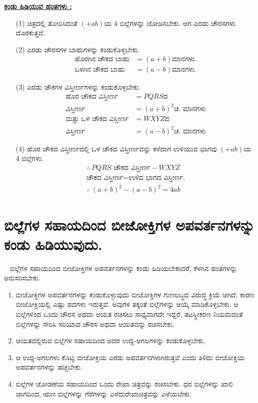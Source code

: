 \begin{enumerate}
\noindent
{\textbf{\underline{ಕಂಡು ಹಿಡಿಯುವ ಹಂತಗಳು :}}}
\begin{itemize}
\item[(1)] ಚಿತ್ರದಲ್ಲಿ ತೋರಿಸಿದಂತೆ $(+ab)$ಯ 4 ಬಿಲ್ಲೆಗಳನ್ನು ಜೋಡಿಸಬೇಕು. ಆಗ ಎರಡು ಚೌರಸಗಳು ದೊರಕುತ್ತವೆ. 
\item[(2)] ಎರಡು ಚೌರಸಗಳ ಬಾಹುಗಳನ್ನು ಕಂಡುಕೊಳ್ಳಬೇಕು.
\begin{align*}
\text{ಹೊರಗಿನ ಚೌಕದ ಬಾಹು} & = (a+b) \text{ಮಾನಗಳು.}\\
\text{ಒಳಗಿನ ಚೌಕದ ಬಾಹು} & = (a-b) \text{ಮಾನಗಳು.}
\end{align*}

\item[(3)] ಎರಡು ಚೌಕಗಳ ವಿಸ್ತೀರ್ಣಗಳನ್ನು ಕಂಡುಕೊಳ್ಳಬೇಕು. 
\begin{align*}
\text{ಹೊರ ಚೌಕದ ವಿಸ್ತೀರ್ಣ} & = PQRS\text{ದ}\\
 \text{ವಿಸ್ತೀರ್ಣ} & = (a+b)^2 \text{ಚ. ಮಾನಗಳು}\\
\text{ಮತ್ತು ಒಳ ಚೌಕದ ವಿಸ್ತೀರ್ಣ} & = WXYZ\text{ದ}\\
\text{ವಿಸ್ತೀರ್ಣ} & = (a-b)^2 \text{ಚ. ಮಾನಗಳು}
\end{align*}

\item[(4)] ಹೊರ ಚೌಕದ ವಿಸ್ತೀರ್ಣದಲ್ಲಿ ಒಳ ಚೌಕದ ವಿಸ್ತೀರ್ಣವನ್ನು ಕಳೆದಾಗ ಉಳಿಯುವ ಭಾಗವು $(+ab)$ಯ 4 ಬಿಲ್ಲೆಗಳು.
\begin{gather*}
\therefore~ PQRS \text{ ಚೌಕದ ವಿಸ್ತೀರ್ಣ} - WXYZ\\
 \text{ಚೌಕದ ವಿಸ್ತೀರ್ಣ}  = \text{ಉಳಿದ ಭಾಗದ ವಿಸ್ತೀರ್ಣ.}\\
\therefore~ (a+b)^2 - (a-b)^2 = 4ab
\end{gather*} 
\end{itemize}
\end{enumerate}

\section{ಬಿಲ್ಲೆಗಳ ಸಹಾಯದಿಂದ ಬೀಜೋಕ್ತಿಗಳ ಅಪವರ್ತನಗಳನ್ನು ಕಂಡು ಹಿಡಿಯುವುದು.}\label{sec3.8}%
~
\vspace{-0.1cm}
ಬಿಲ್ಲೆಗಳ ಸಹಾಯದಿಂದ ಬೀಜೋಕ್ತಿಗಳ ಅಪವರ್ತನಗಳನ್ನು ಕಂಡು ಹಿಡಿಯಬೇಕಾದರೆ, ಕೆಳಗಿನ ಹಂತಗಳನ್ನು ಅನುಸರಿಸಬೇಕು. 
\begin{enumerate}
\item ಬೀಜೋಕ್ತಿಗಳ ಅಪವರ್ತನಗಳನ್ನು ಕಂಡುಕೊಳ್ಳುವುದು ಬೀಜೋಕ್ತಿಗಳ ಗುಣಲಬ್ಧದ ವಿರುದ್ಧ ಕ್ರಿಯೆ ಆಗಿದೆ. ಕಾರಣ ಬೀಜೋಕ್ತಿಯಲ್ಲಿ ಎಷ್ಟು ಪದಗಳು ಇರುತ್ತವೆ. ಅವುಗಳ ತಕ್ಕಂತೆ ಬಿಲ್ಲೆಗಳನ್ನು ಆಯ್ಕೆ ಮಾಡಿಕೊಳ್ಳಬೇಕು. ಆ ಬಿಲ್ಲೆಗಳಿಂದ ಒಂದು ಚೌರಸ ಅಥವಾ ಆಯತ ರಚಿಸಲು ಸಾಧ್ಯವಾಗದೇ ಇದ್ದರೆ, ತಟಸ್ಥೀಕರಣ ನಿಯಮದಂತೆ ಬಿಲ್ಲೆಗಳನ್ನು ಸೇರಿಸಿ ಸರಿಯಾದ ಚೌರಸ ಅಥವಾ ಆಯತವನ್ನು ರಚಿಸಬೇಕು. 
\item ಆಯತದಲ್ಲಿರುವ ಬಿಲ್ಲೆಗಳ ಸಹಾಯದಿಂದ ಅದರ ಉದ್ದ-ಅಗಲಗಳನ್ನು ಕಂಡುಕೊಳ್ಳಬೇಕು. 

\item ಆ ಉದ್ದ-ಅಗಲಗಳು ಕೊಟ್ಟ ಬೀಜೋಕ್ತಿಯ ಎರಡು ಅಪವರ್ತನಗಳಾಗಿರುತ್ತವೆ ಎಂದು ತಿಳಿದು ಬೀಜೋಕ್ತಿಯ ಅಪವರ್ತನಗಳನ್ನು ಹಚ್ಚಬೇಕು.


\item ಬಿಲ್ಲೆಗಳ ಜೋಡಣೆಯ ಸಹಾಯದಿಂದ ಒಂದು ರೇಖಾ ಚಿತ್ರವನ್ನು ರಚಿಸಬೇಕು.  ಧನ ಬಿಲ್ಲೆಗಳನ್ನು ಖಾಲಿ ಜಾಗದಿಂದ, ಋಣ ಬಿಲ್ಲೆಗಳನ್ನು ಗೆರೆಗಳನ್ನು ಎಳೆದು\break ರೇಖಾಚಿತ್ರವನ್ನು ಎಳೆಯಬೇಕು.
\end{enumerate}

